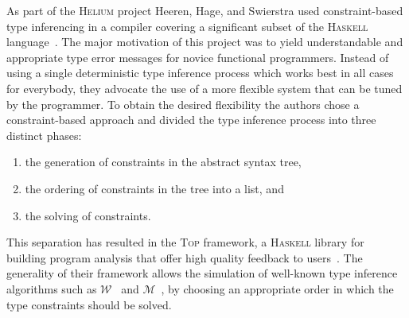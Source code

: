 \bigskip

As part of the \textsc{Helium} project Heeren, Hage, and Swierstra
used constraint-based type inferencing in a compiler covering a
significant subset of the \textsc{Haskell} language~\cite{Heeren2003}.
The major motivation of this project was to yield understandable and
appropriate type error messages for novice functional
programmers. Instead of using a single deterministic type inference
process which works best in all cases for everybody, they advocate the
use of a more flexible system that can be tuned by the programmer. To
obtain the desired flexibility the authors chose a constraint-based
approach and divided the type inference process into three distinct
phases:

\begin{enumerate}
\item the generation of constraints in the abstract syntax tree,
\item the ordering of constraints in the tree into a list, and
\item the solving of constraints.
\end{enumerate}

This separation has resulted in the \textsc{Top} framework, a
\textsc{Haskell} library for building program analysis that offer high
quality feedback to users~\cite{Heeren2005}. The generality of their
framework allows the simulation of well-known type inference
algorithms such as $\mathcal{W}$~\cite{DamasMilner82} and
$\mathcal{M}$~\cite{Lee1998}, by choosing an appropriate order in
which the type constraints should be solved.